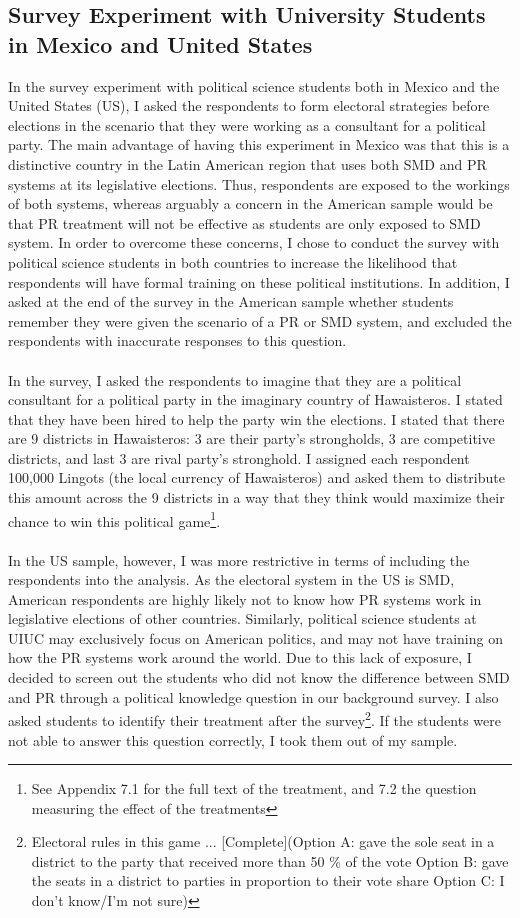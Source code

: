 \documentclass{article}
\begin{document}
\subsection{Survey Experiment with University Students in Mexico and United States}
In the survey experiment with political science students both in Mexico and the United States (US), I asked the respondents to form electoral strategies before elections in the scenario that they were working as a consultant for a political party. The main advantage of having this experiment in Mexico was that this is a distinctive country in the Latin American region that uses both SMD and PR systems at its legislative elections. Thus, respondents are exposed to the workings of both systems, whereas arguably a concern in the American sample would be that PR treatment will not be effective as students are only exposed to SMD system. In order to overcome these concerns, I chose to conduct the survey with political science students in both countries to increase the likelihood that respondents will have formal training on these political institutions. In addition, I asked at the end of the survey in the American sample whether students remember they were given the scenario of a PR or SMD system, and excluded the respondents with inaccurate responses to this question.\\
\\
In the survey, I asked the respondents to imagine that they are a political consultant for a political party in the imaginary country of Hawaisteros. I stated that they have been hired to help the party win the elections. I stated that there are 9 districts in Hawaisteros: 3 are their party's strongholds, 3 are competitive districts, and last 3 are rival party's stronghold. I assigned each respondent 100,000 Lingots (the local currency of Hawaisteros) and asked them to distribute this amount across the 9 districts in a way that they think would maximize their chance to win this political game\footnote{See Appendix 7.1 for the full text of the treatment, and 7.2 the question measuring the effect of the treatments}.\\
\\
In the US sample, however, I was more restrictive in terms of including the respondents into the analysis. As the electoral system in the US is SMD, American respondents are highly likely not to know how PR systems work in legislative elections of other countries. Similarly, political science students at UIUC may exclusively focus on American politics, and may not have training on how the PR systems work around the world. Due to this lack of exposure, I decided to screen out the students who did not know the difference between SMD and PR through a political knowledge question in our background survey. I also asked students to identify their treatment after the survey\footnote{Electoral rules in this game ... [Complete](Option A: gave the sole seat in a district to the party that received more than 50 \% of the vote Option B: gave the seats in a district to parties in proportion to their vote share Option C: I don't know/I'm not sure)}. If the students were not able to answer this question correctly, I took them out of my sample.
\end{document}
